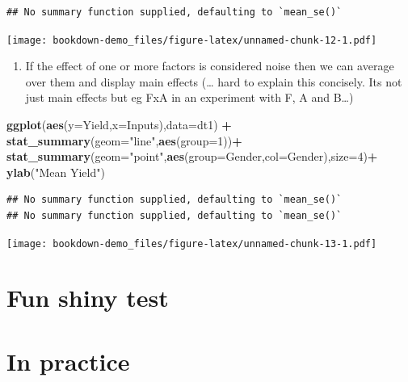 \documentclass[
]{book}
\newenvironment{Shaded}{\begin{snugshade}}{\end{snugshade}}
\newcommand{\DataTypeTok}[1]{\textcolor[rgb]{0.13,0.29,0.53}{#1}}
\newcommand{\DecValTok}[1]{\textcolor[rgb]{0.00,0.00,0.81}{#1}}
\newcommand{\KeywordTok}[1]{\textcolor[rgb]{0.13,0.29,0.53}{\textbf{#1}}}
\newcommand{\NormalTok}[1]{#1}
\newcommand{\OperatorTok}[1]{\textcolor[rgb]{0.81,0.36,0.00}{\textbf{#1}}}
\newcommand{\StringTok}[1]{\textcolor[rgb]{0.31,0.60,0.02}{#1}}
\providecommand{\tightlist}{%
  \setlength{\itemsep}{0pt}\setlength{\parskip}{0pt}}
\begin{document}
\begin{verbatim}
## No summary function supplied, defaulting to `mean_se()`
\end{verbatim}

\texttt{[image: bookdown-demo\_files/figure-latex/unnamed-chunk-12-1.pdf]}

\begin{enumerate}
\def\labelenumi{\arabic{enumi}.}
\setcounter{enumi}{8}
\tightlist
\item
  If the effect of one or more factors is considered noise then we can average over them and display main effects (\ldots{} hard to explain this concisely. Its not just main effects but eg FxA in an experiment with F, A and B\ldots)
\end{enumerate}

\begin{Shaded}
\begin{Highlighting}[]
\KeywordTok{ggplot}\NormalTok{(}\KeywordTok{aes}\NormalTok{(}\DataTypeTok{y=}\NormalTok{Yield,}\DataTypeTok{x=}\NormalTok{Inputs),}\DataTypeTok{data=}\NormalTok{dt1) }\OperatorTok{+}
\StringTok{  }\KeywordTok{stat_summary}\NormalTok{(}\DataTypeTok{geom=}\StringTok{"line"}\NormalTok{,}\KeywordTok{aes}\NormalTok{(}\DataTypeTok{group=}\DecValTok{1}\NormalTok{))}\OperatorTok{+}
\StringTok{    }\KeywordTok{stat_summary}\NormalTok{(}\DataTypeTok{geom=}\StringTok{"point"}\NormalTok{,}\KeywordTok{aes}\NormalTok{(}\DataTypeTok{group=}\NormalTok{Gender,}\DataTypeTok{col=}\NormalTok{Gender),}\DataTypeTok{size=}\DecValTok{4}\NormalTok{)}\OperatorTok{+}
\StringTok{      }\KeywordTok{ylab}\NormalTok{(}\StringTok{"Mean Yield"}\NormalTok{)}
\end{Highlighting}
\end{Shaded}

\begin{verbatim}
## No summary function supplied, defaulting to `mean_se()`
## No summary function supplied, defaulting to `mean_se()`
\end{verbatim}

\texttt{[image: bookdown-demo\_files/figure-latex/unnamed-chunk-13-1.pdf]}

\hypertarget{fun-shiny-test}{%
\section{Fun shiny test}\label{fun-shiny-test}}

\hypertarget{in-practice}{%
\section{In practice}\label{in-practice}}
\end{document}
